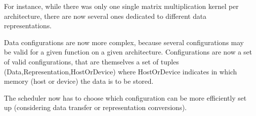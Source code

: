 For instance, while there was only one single matrix multiplication kernel per architecture,
there are now several ones dedicated to different data representations.

Data configurations are now more complex, because several configurations may be
valid for a given function on a given architecture. Configurations are now
a set of valid configurations, that are themselves a set of tuples
(Data,Representation,HostOrDevice) where HostOrDevice indicates in which memory
(host or device) the data is to be stored.

The scheduler now has to choose which configuration can be more efficiently set
up (considering data transfer or representation conversions).
